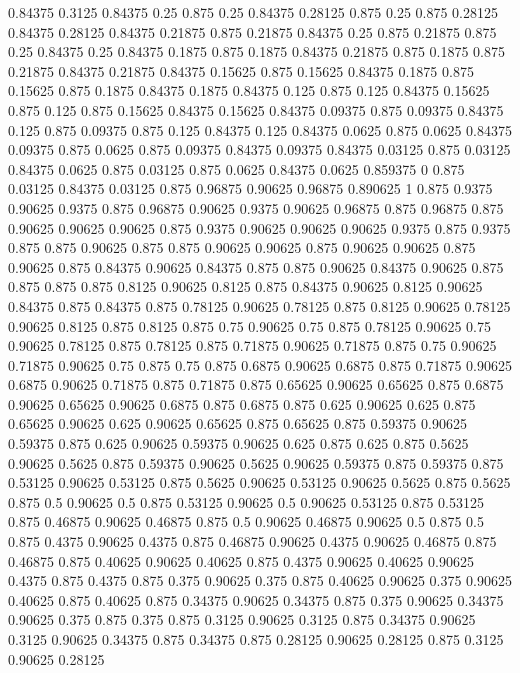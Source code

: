 0.84375 0.3125
0.84375 0.25
0.875 0.25
0.84375 0.28125
0.875 0.25
0.875 0.28125
0.84375 0.28125
0.84375 0.21875
0.875 0.21875
0.84375 0.25
0.875 0.21875
0.875 0.25
0.84375 0.25
0.84375 0.1875
0.875 0.1875
0.84375 0.21875
0.875 0.1875
0.875 0.21875
0.84375 0.21875
0.84375 0.15625
0.875 0.15625
0.84375 0.1875
0.875 0.15625
0.875 0.1875
0.84375 0.1875
0.84375 0.125
0.875 0.125
0.84375 0.15625
0.875 0.125
0.875 0.15625
0.84375 0.15625
0.84375 0.09375
0.875 0.09375
0.84375 0.125
0.875 0.09375
0.875 0.125
0.84375 0.125
0.84375 0.0625
0.875 0.0625
0.84375 0.09375
0.875 0.0625
0.875 0.09375
0.84375 0.09375
0.84375 0.03125
0.875 0.03125
0.84375 0.0625
0.875 0.03125
0.875 0.0625
0.84375 0.0625
0.859375 0
0.875 0.03125
0.84375 0.03125
0.875 0.96875
0.90625 0.96875
0.890625 1
0.875 0.9375
0.90625 0.9375
0.875 0.96875
0.90625 0.9375
0.90625 0.96875
0.875 0.96875
0.875 0.90625
0.90625 0.90625
0.875 0.9375
0.90625 0.90625
0.90625 0.9375
0.875 0.9375
0.875 0.875
0.90625 0.875
0.875 0.90625
0.90625 0.875
0.90625 0.90625
0.875 0.90625
0.875 0.84375
0.90625 0.84375
0.875 0.875
0.90625 0.84375
0.90625 0.875
0.875 0.875
0.875 0.8125
0.90625 0.8125
0.875 0.84375
0.90625 0.8125
0.90625 0.84375
0.875 0.84375
0.875 0.78125
0.90625 0.78125
0.875 0.8125
0.90625 0.78125
0.90625 0.8125
0.875 0.8125
0.875 0.75
0.90625 0.75
0.875 0.78125
0.90625 0.75
0.90625 0.78125
0.875 0.78125
0.875 0.71875
0.90625 0.71875
0.875 0.75
0.90625 0.71875
0.90625 0.75
0.875 0.75
0.875 0.6875
0.90625 0.6875
0.875 0.71875
0.90625 0.6875
0.90625 0.71875
0.875 0.71875
0.875 0.65625
0.90625 0.65625
0.875 0.6875
0.90625 0.65625
0.90625 0.6875
0.875 0.6875
0.875 0.625
0.90625 0.625
0.875 0.65625
0.90625 0.625
0.90625 0.65625
0.875 0.65625
0.875 0.59375
0.90625 0.59375
0.875 0.625
0.90625 0.59375
0.90625 0.625
0.875 0.625
0.875 0.5625
0.90625 0.5625
0.875 0.59375
0.90625 0.5625
0.90625 0.59375
0.875 0.59375
0.875 0.53125
0.90625 0.53125
0.875 0.5625
0.90625 0.53125
0.90625 0.5625
0.875 0.5625
0.875 0.5
0.90625 0.5
0.875 0.53125
0.90625 0.5
0.90625 0.53125
0.875 0.53125
0.875 0.46875
0.90625 0.46875
0.875 0.5
0.90625 0.46875
0.90625 0.5
0.875 0.5
0.875 0.4375
0.90625 0.4375
0.875 0.46875
0.90625 0.4375
0.90625 0.46875
0.875 0.46875
0.875 0.40625
0.90625 0.40625
0.875 0.4375
0.90625 0.40625
0.90625 0.4375
0.875 0.4375
0.875 0.375
0.90625 0.375
0.875 0.40625
0.90625 0.375
0.90625 0.40625
0.875 0.40625
0.875 0.34375
0.90625 0.34375
0.875 0.375
0.90625 0.34375
0.90625 0.375
0.875 0.375
0.875 0.3125
0.90625 0.3125
0.875 0.34375
0.90625 0.3125
0.90625 0.34375
0.875 0.34375
0.875 0.28125
0.90625 0.28125
0.875 0.3125
0.90625 0.28125
